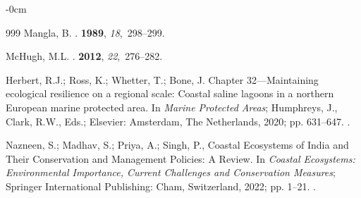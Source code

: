 \documentclass[jmse,article,accept,pdftex,oneauthor]{Definitions/mdpi}
\begin{document}
\begin{adjustwidth}{-\extralength}{0cm}
\begin{thebibliography}{999}
Mangla, B.
.
 {\bf 1989}, {\em 18},~298--299.

McHugh, M.L.
.
 {\bf 2012}, {\em 22},~276--282.

Herbert, R.J.; Ross, K.; Whetter, T.; Bone, J.
\newblock Chapter 32---Maintaining ecological resilience on a regional scale:
  Coastal saline lagoons in a northern European marine protected area. In {\em
  Marine Protected Areas}; Humphreys, J., Clark, R.W., Eds.; Elsevier:  {Amsterdam, The Netherlands,} 
  2020; pp. 631--647.
.

Nazneen, S.; Madhav, S.; Priya, A.; Singh, P., Coastal Ecosystems of India and
  Their Conservation and Management Policies: A Review.
\newblock In {\em Coastal Ecosystems: Environmental Importance, Current
  Challenges and Conservation Measures}; Springer International Publishing:
  Cham, Switzerland, 2022; pp. 1--21.
.

\end{thebibliography}
\PublishersNote{}

%
%
%
\end{adjustwidth}
\end{document}
